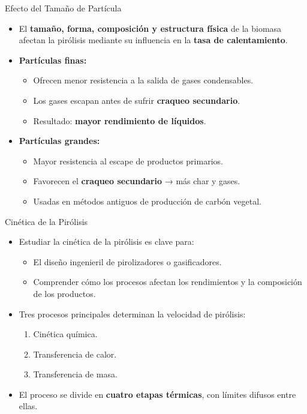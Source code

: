 \documentclass[../../main.tex]{subfiles}
\begin{document}
\begin{frame}{Efecto del Tamaño de Partícula}
\small
\begin{itemize}
  \item El \textbf{tamaño, forma, composición y estructura física} de la biomasa afectan la pirólisis mediante su influencia en la \textbf{tasa de calentamiento}.
  
  \item \textbf{Partículas finas:}
  \begin{itemize}
    \item Ofrecen menor resistencia a la salida de gases condensables.
    \item Los gases escapan antes de sufrir \textbf{craqueo secundario}.
    \item Resultado: \textbf{mayor rendimiento de líquidos}.
  \end{itemize}

  \item \textbf{Partículas grandes:}
  \begin{itemize}
    \item Mayor resistencia al escape de productos primarios.
    \item Favorecen el \textbf{craqueo secundario} → más char y gases.
    \item Usadas en métodos antiguos de producción de carbón vegetal.
  \end{itemize}
\end{itemize}
\end{frame}

\begin{frame}{Cinética de la Pirólisis}
\small
\begin{itemize}
  \item Estudiar la cinética de la pirólisis es clave para:
  \begin{itemize}
    \item El diseño ingenieril de pirolizadores o gasificadores.
    \item Comprender cómo los procesos afectan los rendimientos y la composición de los productos.
  \end{itemize}
  \item Tres procesos principales determinan la velocidad de pirólisis:
  \begin{enumerate}
    \item Cinética química.
    \item Transferencia de calor.
    \item Transferencia de masa.
  \end{enumerate}
  \item El proceso se divide en \textbf{cuatro etapas térmicas}, con límites difusos entre ellas.
\end{itemize}
\end{frame}
\end{document}
